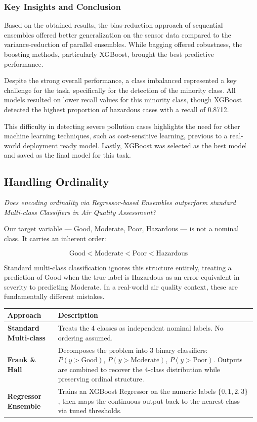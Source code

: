 \documentclass[a4paper,12pt]{article}
\begin{document}
	\subsubsection{Key Insights and Conclusion}
	Based on the obtained results, the bias-reduction approach of sequential ensembles offered better generalization on the sensor data compared to the variance-reduction of parallel ensembles. While bagging offered robustness, the boosting methods, particularly XGBoost, brought the best predictive performance. 
	
	Despite the strong overall performance, a class imbalanced represented a key challenge for the task, specifically for the detection of the minority class. All models resulted on lower recall values for this minority class, though XGBoost detected the highest proportion of hazardous cases with a recall of 0.8712. 
	
	This difficulty in detecting severe pollution cases highlights the need for other machine learning techniques, such as cost-sensitive learning, previous to a real-world deployment ready model. Lastly, XGBoost was selected as the best model and saved as the final model for this task.
	
	
	\subsection{Handling Ordinality}
	\textit{Does encoding ordinality via Regressor-based Ensembles outperform standard Multi-class Classifiers in Air Quality Assessment?}
	
	Our target variable — Good, Moderate, Poor, Hazardous — is not a
	nominal class. It carries an inherent order:
	
	\[
	\text{Good} < \text{Moderate} < \text{Poor} < \text{Hazardous}
	\]
	
	Standard multi-class classification ignores this structure entirely, treating a prediction of Good when the true label is Hazardous as an error equivalent in severity to	predicting Moderate. In a real-world air quality context, these are fundamentally different	mistakes.
	
	\bigskip
	
	\begin{center}
		\begin{tabular}{>{\bfseries}lp{10cm}}
			\toprule
			Approach & Description \\
			\midrule
			Standard Multi-class &
			Treats the 4 classes as independent nominal labels. No ordering assumed. \\[0.5em]
			Frank \& Hall &
			Decomposes the problem into 3 binary classifiers: $P(y > \text{Good})$,
			$P(y > \text{Moderate})$, $P(y > \text{Poor})$. Outputs are combined to recover the
			4-class distribution while preserving ordinal structure. \\[0.5em]
			Regressor Ensemble &
			Trains an XGBoost Regressor on the numeric labels $\{0,1,2,3\}$, then maps the
			continuous output back to the nearest class via tuned thresholds. \\
			\bottomrule
		\end{tabular}
	\end{center}
	
\end{document}
